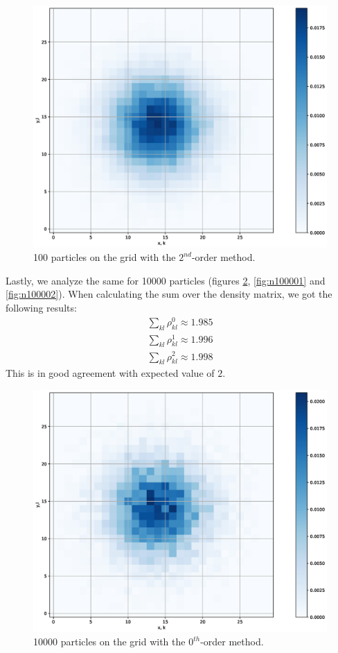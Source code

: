 \documentclass{scrartcl}
\begin{document}
\begin{figure}[h]
	\centering
	\includegraphics[width=0.9\linewidth]{Plots/N10000_2}
	\caption{100 particles on the grid with the \(2^{nd}\)-order method.}
	\label{fig:n1002}
\end{figure}\newpage
Lastly, we analyze the same for 10000 particles (figures \ref{fig:n100000}, \ref{fig:n100001} and \ref{fig:n100002}). When calculating the sum over the density matrix, we got the following results:
\begin{align}
	\sum_{kl} \rho_{kl}^0 \approx 1.985\\
	\sum_{kl} \rho_{kl}^1 \approx 1.996\\
	\sum_{kl} \rho_{kl}^2 \approx 1.998
\end{align}
This is in good agreement with expected value of \(2\).
\begin{figure}[h]
	\centering
	\includegraphics[width=0.9\linewidth]{Plots/N10000_0}
	\caption{10000 particles on the grid with the \(0^{th}\)-order method.}
	\label{fig:n100000}
\end{figure}
\end{document}
